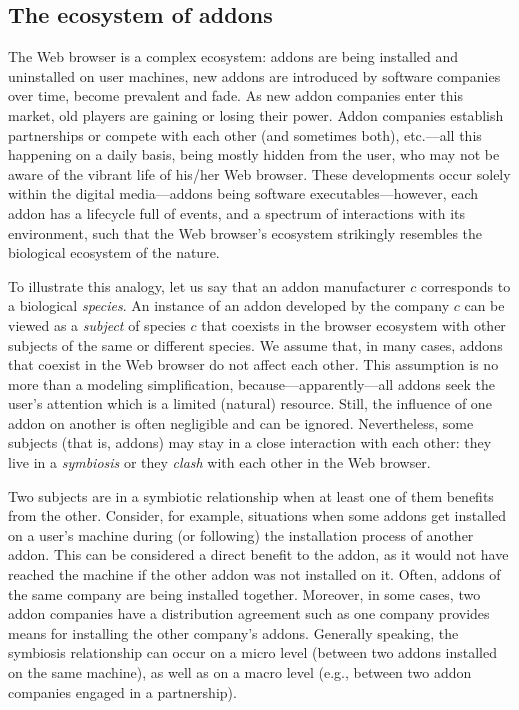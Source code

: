 \documentclass[ijoc,nonblindrev]{informs3} %
\numberwithin{equation}{subsection}
\begin{document}
\subsection{The ecosystem of addons}

The Web browser is a complex ecosystem: addons are being installed and uninstalled on user machines, new addons are introduced by software companies over time, become prevalent and fade. As new addon companies enter this market, old players are gaining or losing their power. Addon companies establish partnerships or compete with each other (and sometimes both), etc.---all this happening on a daily basis, being mostly hidden from the user, who may not be aware of the vibrant life of his/her Web browser. These developments occur solely within the digital media---addons being software executables---however, each addon has a lifecycle full of events, and a spectrum of interactions with its environment, such that the Web browser's ecosystem strikingly resembles the biological ecosystem of the nature.

To illustrate this analogy, let us say that an addon manufacturer $c$ corresponds to a biological \emph{species}. An instance of an addon developed by the company $c$ can be viewed as a \emph{subject} of species $c$ that coexists in the browser ecosystem with other subjects of the same or different species. We assume that, in many cases, addons that coexist in the Web browser do not affect each other. This assumption is no more than a modeling simplification, because---apparently---all addons seek the user's attention which is a limited (natural) resource. Still, the influence of one addon on another is often negligible and can be ignored. Nevertheless, some subjects (that is, addons) may stay in a close interaction with each other: they live in a \emph{symbiosis} or they \emph{clash} with each other in the Web browser.

Two subjects are in a symbiotic relationship when at least one of them benefits from the other. Consider, for example, situations when some addons get installed on a user's machine during (or following) the installation process of another addon. This can be considered a direct benefit to the addon, as it would not have reached the machine if the other addon was not installed on it. Often, addons of the same company are being installed together. Moreover, in some cases, two addon companies have a distribution agreement such as one company provides means for installing the other company's addons. Generally speaking, the symbiosis relationship can occur on a micro level (between two addons installed on the same machine), as well as on a macro level (e.g., between two addon companies engaged in a partnership).
\end{document}
